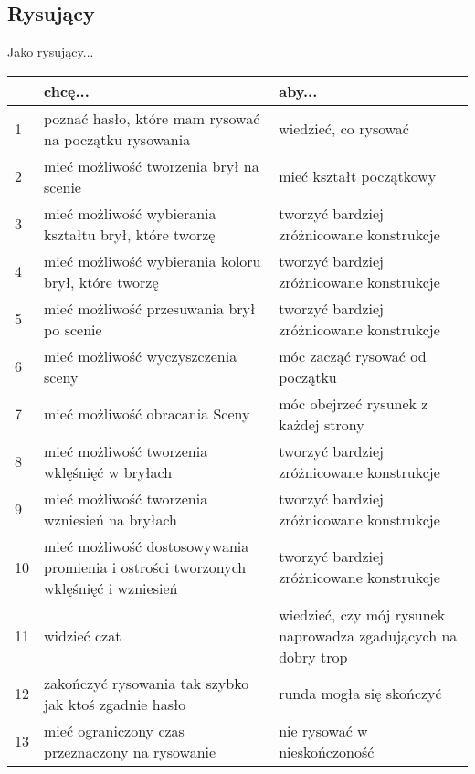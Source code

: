 \subsection{Rysujący}
Jako rysujący...
\begin{center}
    \begin{tabular}{ | l || p{5.5cm} | p{5.5cm} |}
    \hline
     & \textbf{chcę...} & \textbf{aby...} \\ \hline \hline
    1 & poznać hasło, które mam rysować na początku rysowania & wiedzieć, co rysować \\ \hline
    2 & mieć możliwość tworzenia brył na scenie & mieć kształt początkowy \\ \hline
    3 & mieć możliwość wybierania kształtu brył, które tworzę & tworzyć bardziej zróżnicowane konstrukcje \\ \hline
    4 & mieć możliwość wybierania koloru brył, które tworzę & tworzyć bardziej zróżnicowane konstrukcje \\ \hline
    5 & mieć możliwość przesuwania brył po scenie & tworzyć bardziej zróżnicowane konstrukcje \\ \hline
    6 & mieć możliwość wyczyszczenia sceny & móc zacząć rysować od początku \\ \hline
    7 & mieć możliwość obracania Sceny & móc obejrzeć rysunek z każdej strony \\ \hline
    8 & mieć możliwość tworzenia wklęśnięć w bryłach & tworzyć bardziej zróżnicowane konstrukcje \\ \hline
    9 & mieć możliwość tworzenia wzniesień na bryłach & tworzyć bardziej zróżnicowane konstrukcje \\ \hline
    10 & mieć możliwość dostosowywania promienia i ostrości tworzonych wklęśnięć i wzniesień & tworzyć bardziej zróżnicowane konstrukcje \\ \hline
    11 & widzieć czat & wiedzieć, czy mój rysunek naprowadza zgadujących na dobry trop \\ \hline
    12 & zakończyć rysowania tak szybko jak ktoś zgadnie hasło & runda mogła się skończyć \\ \hline
    13 & mieć ograniczony czas przeznaczony na rysowanie & nie rysować w nieskończoność \\ \hline
    \end{tabular}
\end{center}

